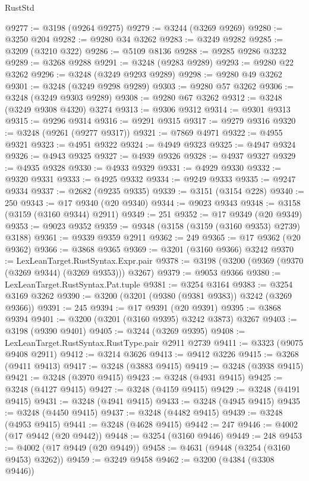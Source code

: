 \begin{lexlean}{RustStd}
\begin{coremodule}
{\begin{coremodule}
{{{{{{{{{{{{{{{{{{{{{{{{{@9277 := @3198 (@9264 @9275)
@9279 := @3244 (@3269 @9269)
@9280 := @3250 @204
@9282 := @9280 @34 @3262
@9283 := @3249 @9282
@9285 := @3209 (@3210 @322)
@9286 := @5109 @8136
@9288 := @9285 @9286 @3232
@9289 := @3268 @9288
@9291 := @3248 (@9283 @9289)
@9293 := @9280 @22 @3262
@9296 := @3248 (@3249 @9293 @9289)
@9298 := @9280 @49 @3262
@9301 := @3248 (@3249 @9298 @9289)
@9303 := @9280 @57 @3262
@9306 := @3248 (@3249 @9303 @9289)
@9308 := @9280 @67 @3262
@9312 := @3248 (@3249 @9308 @4320) @3274
@9313 := @9306 @9312
@9314 := @9301 @9313
@9315 := @9296 @9314
@9316 := @9291 @9315
@9317 := @9279 @9316
@9320 := @3248 (@9261 (@9277 @9317))
@9321 := @7869 @4971
@9322 := @4955 @9321
@9323 := @4951 @9322
@9324 := @4949 @9323
@9325 := @4947 @9324
@9326 := @4943 @9325
@9327 := @4939 @9326
@9328 := @4937 @9327
@9329 := @4935 @9328
@9330 := @4933 @9329
@9331 := @4929 @9330
@9332 := @9320 @9331
@9333 := @4925 @9332
@9334 := @9249 @9333
@9335 := @9247 @9334
@9337 := @2682 (@9235 @9335)
@9339 := @3151 (@3154 @228)
@9340 := 250
@9343 := @17 @9340 (@20 @9340)
@9344 := @9023 @9343
@9348 := @3158 (@3159 (@3160 @9344) @2911)
@9349 := 251
@9352 := @17 @9349 (@20 @9349)
@9353 := @9023 @9352
@9359 := @9348 (@3158 (@3159 (@3160 @9353) @2739) @3188)
@9361 := @9339 @9359 @2911
@9362 := 249
@9365 := @17 @9362 (@20 @9362)
@9366 := @3868 @9365
@9369 := @3201 (@3160 @9366) @3242
@9370 := LexLeanTarget.RustSyntax.Expr.pair
@9378 := @3198 (@3200 (@9369 (@9370 (@3269 @9344) (@3269 @9353))) @3267)
@9379 := @9053 @9366
@9380 := LexLeanTarget.RustSyntax.Pat.tuple
@9381 := @3254 @3164
@9383 := @3254 @3169 @3262
@9390 := @3200 (@3201 (@9380 (@9381 @9383)) @3242 (@3269 @9366))
@9391 := 245
@9394 := @17 @9391 (@20 @9391)
@9395 := @3868 @9394
@9401 := @3200 (@3201 (@3160 @9395) @3242 @3873) @3267
@9403 := @3198 (@9390 @9401)
@9405 := @3244 (@3269 @9395)
@9408 := LexLeanTarget.RustSyntax.RustType.pair @2911 @2739
@9411 := @3323 (@9075 @9408 @2911)
@9412 := @3214 @3626
@9413 := @9412 @3226
@9415 := @3268 (@9411 @9413)
@9417 := @3248 (@3883 @9415)
@9419 := @3248 (@3938 @9415)
@9421 := @3248 (@3970 @9415)
@9423 := @3248 (@4931 @9415)
@9425 := @3248 (@4127 @9415)
@9427 := @3248 (@4159 @9415)
@9429 := @3248 (@4191 @9415)
@9431 := @3248 (@4941 @9415)
@9433 := @3248 (@4945 @9415)
@9435 := @3248 (@4450 @9415)
@9437 := @3248 (@4482 @9415)
@9439 := @3248 (@4953 @9415)
@9441 := @3248 (@4628 @9415)
@9442 := 247
@9446 := @4002 (@17 @9442 (@20 @9442))
@9448 := @3254 (@3160 @9446)
@9449 := 248
@9453 := @4002 (@17 @9449 (@20 @9449))
@9458 := @4631 (@9448 (@3254 (@3160 @9453) @3262))
@9459 := @3249 @9458
@9462 := @3200 (@4384 (@3308 @9446))
}}}}}}}}}}}}}}}}}}}}}}}}}
\end{coremodule}}
\end{coremodule}
\end{lexlean}
